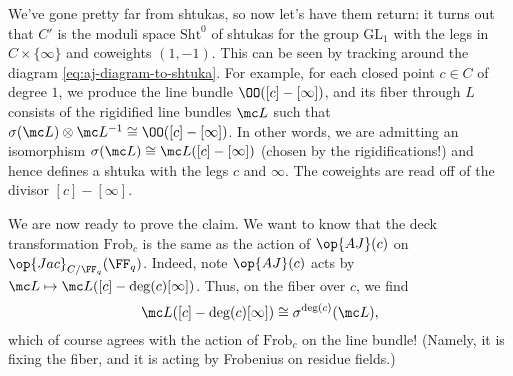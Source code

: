 \documentclass[../notes.tex]{subfiles}
\begin{document}
\begin{remark}
	We've gone pretty far from shtukas, so now let's have them return: it turns out that $C'$ is the moduli space $\mathrm{Sht}^0$ of shtukas for the group $\mathrm{GL}_1$ with the legs in $C\times\{\infty\}$ and coweights $(1,-1)$. This can be seen by tracking around the diagram \eqref{eq:aj-diagram-to-shtuka}. For example, for each closed point $c\in C$ of degree $1$, we produce the line bundle $\OO([c]-[\infty])$, and its fiber through $L$ consists of the rigidified line bundles $\mc L$ such that $\sigma(\mc L)\otimes\mc L^{-1}\cong\OO([c]-[\infty])$. In other words, we are admitting an isomorphism $\sigma(\mc L)\cong\mc L([c]-[\infty])$ (chosen by the rigidifications!) and hence defines a shtuka with the legs $c$ and $\infty$. The coweights are read off of the divisor $[c]-[\infty]$.
\end{remark}
We are now ready to prove the claim. We want to know that the deck transformation $\mathrm{Frob}_c$ is the same as the action of $\op{AJ}(c)$ on $\op{Jac}_{C/\FF_q}(\FF_q)$. Indeed, note $\op{AJ}(c)$ acts by $\mc L\mapsto\mc L([c]-\deg(c)[\infty])$. Thus, on the fiber over $c$, we find
\[\mc L([c]-\deg(c)[\infty])\cong\sigma^{\deg(c)}(\mc L),\]
which of course agrees with the action of $\mathrm{Frob}_c$ on the line bundle! (Namely, it is fixing the fiber, and it is acting by Frobenius on residue fields.) 
\end{document}
